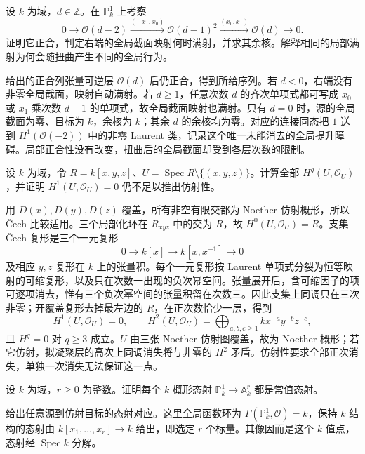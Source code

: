 \begin{optionalexercise}\label{b3:ex:24-global-sections-not-right-exact}
	设 \(k\) 为域，\(d\in\mathbb Z\)。在 \(\mathbb P_k^1\) 上考察
	\[
		0\longrightarrow\mathcal O(d-2) \xrightarrow{(-x_1,x_0)} \mathcal O(d-1)^2 \xrightarrow{(x_0,x_1)} \mathcal O(d)\longrightarrow0.
	\]
	证明它正合，判定右端的全局截面映射何时满射，并求其余核。解释相同的局部满射为何会随扭曲产生不同的全局行为。
\end{optionalexercise}
\begin{solution}
	给出的正合列张量可逆层 \(\mathcal O(d)\) 后仍正合，得到所给序列。若 \(d<0\)，右端没有非零全局截面，映射自动满射。若 \(d\ge1\)，任意次数 \(d\) 的齐次单项式都可写成 \(x_0\) 或 \(x_1\) 乘次数 \(d-1\) 的单项式，故全局截面映射也满射。只有 \(d=0\) 时，源的全局截面为零、目标为 \(k\)，余核为 \(k\)；其余 \(d\) 的余核均为零。对应的连接同态把 \(1\) 送到 \(H^1(\mathcal O(-2))\) 中的非零 Laurent 类，记录这个唯一未能消去的全局提升障碍。局部正合性没有改变，扭曲后的全局截面却受到各层次数的限制。
\end{solution}

\begin{optionalexercise}\label{b3:ex:24-punctured-plane}
	设 \(k\) 为域，令 \(R=k[x,y,z]\)、\(U=\operatorname{Spec}R\setminus\{(x,y,z)\}\)。计算全部 \(H^q(U,\mathcal O_U)\)，并证明 \(H^1(U,\mathcal O_U)=0\) 仍不足以推出仿射性。
\end{optionalexercise}
\begin{solution}
	用 \(D(x),D(y),D(z)\) 覆盖，所有非空有限交都为 Noether 仿射概形，所以 Čech 比较适用。三个局部化环在 \(R_{xyz}\) 中的交为 \(R\)，故 \(H^0(U,\mathcal O_U)=R\)。支集 Čech 复形是三个一元复形
	\[
		0\longrightarrow k[x]\longrightarrow k[x,x^{-1}]\longrightarrow0
	\]
	及相应 \(y,z\) 复形在 \(k\) 上的张量积。每个一元复形按 Laurent 单项式分裂为恒等映射的可缩复形，以及只在次数一出现的负次幂空间。张量展开后，含可缩因子的项可逐项消去，惟有三个负次幂空间的张量积留在次数三。因此支集上同调只在三次非零；开覆盖复形去掉最左边的 \(R\)，在正次数恰少一层，得到
	\[
		H^1(U,\mathcal O_U)=0,\qquad H^2(U,\mathcal O_U)= \bigoplus_{a,b,c\ge1}k x^{-a}y^{-b}z^{-c},
	\]
	且 \(H^q=0\) 对 \(q\ge3\) 成立。\(U\) 由三张 Noether 仿射图覆盖，故为 Noether 概形；若它仿射，拟凝聚层的高次上同调消失将与非零的 \(H^2\) 矛盾。仿射性要求全部正次消失，单独一次消失无法保证这一点。
\end{solution}

\begin{optionalexercise}\label{b3:ex:24-maps-projective-to-affine}
	设 \(k\) 为域，\(r\ge0\) 为整数。证明每个 \(k\) 概形态射 \(\mathbb P_k^1\rightarrow\mathbb A_k^r\) 都是常值态射。
\end{optionalexercise}
\begin{solution}
	给出任意源到仿射目标的态射对应。这里全局函数环为 \(\Gamma(\mathbb P_k^1,\mathcal O)=k\)，保持 \(k\) 结构的态射由 \(k[x_1,\ldots,x_r]\rightarrow k\) 给出，即选定 \(r\) 个标量。其像因而是这个 \(k\) 值点，态射经 \(\operatorname{Spec}k\) 分解。
\end{solution}

